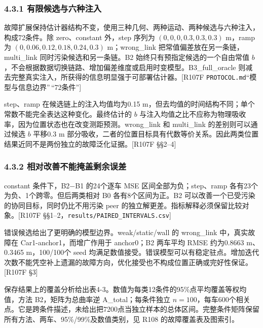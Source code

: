 \documentclass[12pt,a4paper]{article}
\begin{document}
\subsubsection{4.3.1
有限候选与六种注入}\label{ux6709ux9650ux5019ux9009ux4e0eux516dux79cdux6ce8ux5165}

故障扩展保持估计器结构不变，使用三种几何、两种运动、两种候选与六种注入，构成72条件。除
zero、constant 外，step 序列为 \((0,0,0,0.3,0.3,0.3)\) m，ramp 为
\((0,0.06,0.12,0.18,0.24,0.3)\) m；wrong\_link
把常值偏差放在另一条链，multi\_link 同时污染候选和另一条链。B2
始终只有预指定候选的一个自由常值
\(b\)，不会根据数据切换链路、增加偏差维度或启用时变模型。B3\_full\_oracle
则减去完整真实注入，所获得的信息明显强于可部署估计器。{[}R107F
\texttt{PROTOCOL.md}``模型与信息边界''\,``72条件''{]}

step、ramp 在候选链上的注入均值均为0.15
m，但去均值的时间结构不同；单个常数不能完全表达这种变化。最终估计的
\(b\)
与注入均值之比不应称为物理吸收率，因为位置状态也在改变测距预测。wrong\_link
和 multi\_link 的差别则可以通过候选 \(b\) 平移0.3 m
部分吸收，二者的位置目标具有代数等价关系。因此两类位置结果近同不是两份独立的故障泛化证据。{[}R107F
§§2--4{]}

\subsubsection{4.3.2
相对改善不能掩盖剩余误差}\label{ux76f8ux5bf9ux6539ux5584ux4e0dux80fdux63a9ux76d6ux5269ux4f59ux8befux5dee}

constant 条件下，B2−B1 的24个逐车 MSE 区间全部为负；step、ramp
各有23个为负、1个跨零。但后两类相对 B0 各有8个区间为正。B2
可以改善一个已受污染的协同目标，同时仍比不用污染 peer
的独立解更差。指标解释必须保留比较对象。{[}R107F
§§1--2，\texttt{results/PAIRED\_INTERVALS.csv}{]}

错误候选给出了更明确的模型边界。weak/static/wall 的 wrong\_link
中，真实故障在 Car1-anchor1，而增广作用于 anchor0；B2 两车平均 RMSE
约为0.8663 m、0.3465 m，100/100个 seed
均满足数值接受。错误模型可以有稳定驻点。增加迭代次数不能凭空补上遗漏的故障方向，优化接受也不构成位置正确或完好性保证。{[}R107F
§3{]}

保存结果上的覆盖分析给出表4-3。数值为每类12条件的95\%点平均覆盖等权均值，方法
B2，矩阵为总曲率逆 A\_total；每条件独立
\(n=100\)，每车600个相关点。它是跨条件描述，未给出把7200点当独立样本的总体区间。完整条件矩阵保留所有方法、两车、95\%/99\%及数值类别，见
R108 的故障覆盖表及图索引。
\end{document}
